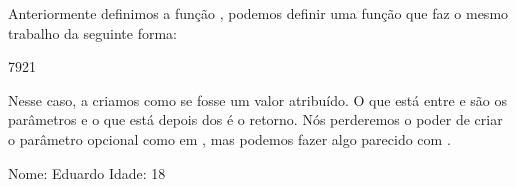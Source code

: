 \documentclass[letterpaper,10pt,english]{jupyterBook}
\begin{document}
\sphinxAtStartPar
Anteriormente definimos a função , podemos definir uma função que faz o mesmo trabalho da seguinte forma:

\begin{sphinxVerbatim}[commandchars=\\\{\}]
     

 
\end{sphinxVerbatim}

\begin{sphinxVerbatim}[commandchars=\\\{\}]
7921
\end{sphinxVerbatim}

\sphinxAtStartPar
Nesse caso, a criamos como se fosse um valor atribuído. O que está entre  e \sphinxcode{\sphinxupquote{:}} são os parâmetros e o que está depois dos \sphinxcode{\sphinxupquote{:}} é o retorno. Nós perderemos o poder de criar o parâmetro opcional como em , mas podemos fazer algo parecido com .

\begin{sphinxVerbatim}[commandchars=\\\{\}]
      
 
\end{sphinxVerbatim}

\begin{sphinxVerbatim}[commandchars=\\\{\}]
 Nome: Eduardo 
 Idade: 18
\end{sphinxVerbatim}
\end{document}
